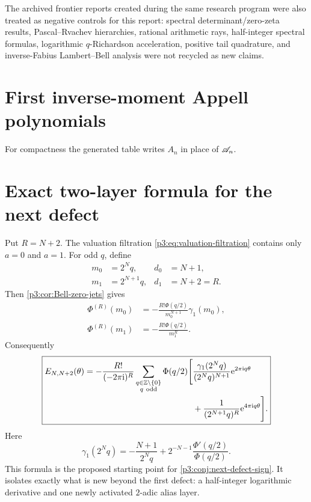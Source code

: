 \documentclass[11pt,oneside]{article}
\numberwithin{equation}{section}
\theoremstyle{definition}
\theoremstyle{remark}
\newcommand{\Z}{\mathbb Z}
\newcommand{\e}{\mathrm e}
\begin{document}
The archived frontier reports created during the same research program were also treated as negative controls for this report: spectral determinant/zero-zeta results, Pascal--Rvachev hierarchies, rational arithmetic rays, half-integer spectral formulas, logarithmic $q$-Richardson acceleration, positive tail quadrature, and inverse-Fabius Lambert--Bell analysis were not recycled as new claims.

\section{First inverse-moment Appell polynomials}
\label{p3:app:Appell-table}

For compactness the generated table writes $A_n$ in place of $\mathscr A_n$.


\section{Exact two-layer formula for the next defect}
\label{p3:app:next-defect}

Put $R=N+2$.  The valuation filtration \eqref{p3:eq:valuation-filtration} contains only $a=0$ and $a=1$.  For odd $q$, define
\begin{align}
 m_0&=2^Nq,&d_0&=N+1,\\
 m_1&=2^{N+1}q,&d_1&=N+2=R.
\end{align}
Then \cref{p3:cor:Bell-zero-jets} gives
\begin{align}
 \Phi^{(R)}(m_0)
 &=-\frac{R!\Phi(q/2)}{m_0^{N+1}}\gamma_1(m_0),
 \label{p3:eq:next-defect-layer0}\\
 \Phi^{(R)}(m_1)
 &=-\frac{R!\Phi(q/2)}{m_1^R}.
 \label{p3:eq:next-defect-layer1}
\end{align}
Consequently
\begin{equation}
\boxed{
\begin{aligned}
 E_{N,N+2}(\theta)
 =-\frac{R!}{(-2\pi\iu)^R}
 \sum_{\substack{q\in\Z\setminus\{0\}\\q\ \mathrm{odd}}}
 \Phi(q/2)\Bigg[&
 \frac{\gamma_1(2^Nq)}{(2^Nq)^{N+1}}
 \e^{2\pi\iu q\theta}\\
 &+\frac{1}{(2^{N+1}q)^R}
 \e^{4\pi\iu q\theta}\Bigg].
\end{aligned}}
\label{p3:eq:next-defect-exact}
\end{equation}
Here
\begin{equation}
 \gamma_1(2^Nq)
 =-\frac{N+1}{2^Nq}
 +2^{-N-1}\frac{\Phi'(q/2)}{\Phi(q/2)}.
 \label{p3:eq:next-defect-gamma1}
\end{equation}
This formula is the proposed starting point for \cref{p3:conj:next-defect-sign}.  It isolates exactly what is new beyond the first defect: a half-integer logarithmic derivative and one newly activated $2$-adic alias layer.
\end{document}
